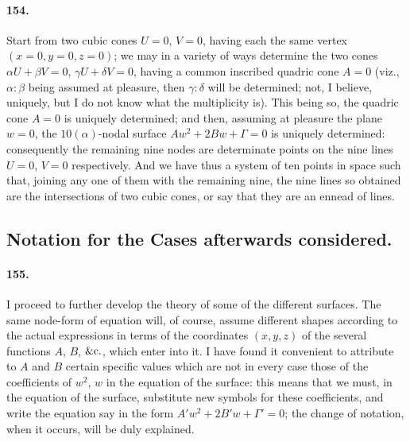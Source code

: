 \documentclass[11pt,a4paper]{article}
\begin{document}
\paragraph{154.}
Start from two cubic cones $U = 0$, $V = 0$, having each the same vertex
$(x = 0, y = 0, z = 0)$; we may in a variety of ways determine the two
cones $\alpha U + \beta V = 0$, $\gamma U + \delta V = 0$, having a
common inscribed quadric cone $A = 0$ (viz., $\alpha : \beta$ being
assumed at pleasure, then $\gamma : \delta$ will be determined; not, I
believe, uniquely, but I do not know what the multiplicity is). This
being so, the quadric cone $A = 0$ is uniquely determined; and then,
assuming at pleasure the plane $w = 0$, the $10(\alpha)$-nodal surface
$Aw^2 + 2Bw + \Gamma = 0$ is uniquely determined: consequently the
remaining nine nodes are determinate points on the nine lines $U = 0$,
$V = 0$ respectively. And we have thus a system of ten points in space
such that, joining any one of them with the remaining nine, the nine
lines so obtained are the intersections of two cubic cones, or say that
they are an ennead of lines.

\subsection*{Notation for the Cases afterwards considered.}

\paragraph{155.}
I proceed to further develop the theory of some of the different
surfaces. The same node-form of equation will, of course, assume different
shapes according to the actual expressions in terms of the coordinates
$(x, y, z)$ of the several functions $A$, $B$, $\&{\rm c}.$, which enter
into it. I have found it convenient to attribute to $A$ and $B$ certain
specific values which are not in every case those of the coefficients of
$w^2$, $w$ in the equation of the surface: this means that we must, in
the equation of the surface, substitute new symbols for these
coefficients, and write the equation say in the form
$A'w^2 + 2B'w + \Gamma' = 0$; the change of notation, when it occurs,
will be duly explained.
\end{document}
